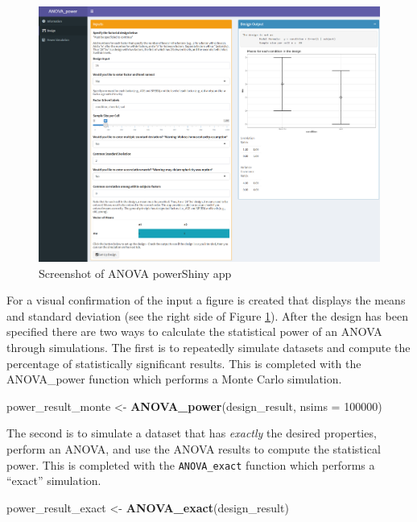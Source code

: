 \documentclass[
  ,man,floatsintext]{apa6}
\newenvironment{Shaded}{\begin{snugshade}}{\end{snugshade}}
\newcommand{\DataTypeTok}[1]{\textcolor[rgb]{0.13,0.29,0.53}{#1}}
\newcommand{\DecValTok}[1]{\textcolor[rgb]{0.00,0.00,0.81}{#1}}
\newcommand{\KeywordTok}[1]{\textcolor[rgb]{0.13,0.29,0.53}{\textbf{#1}}}
\newcommand{\NormalTok}[1]{#1}
\newcommand{\StringTok}[1]{\textcolor[rgb]{0.31,0.60,0.02}{#1}}
\begin{document}
\begin{figure}
\includegraphics[width=6.69in]{screenshots/anova_power} \caption{Screenshot of ANOVA powerShiny app}\label{fig:scr2}
\end{figure}

For a visual confirmation of the input a figure is created that displays the means and standard deviation (see the right side of Figure \ref{fig:scr2}).
After the design has been specified there are two ways to calculate the statistical power of an ANOVA through simulations.
The first is to repeatedly simulate datasets and compute the percentage of statistically significant results. This is completed with the ANOVA\_power function which performs a Monte Carlo simulation.

\begin{Shaded}
\begin{Highlighting}[]
\NormalTok{power_result_monte <-}\StringTok{ }\KeywordTok{ANOVA_power}\NormalTok{(design_result, }\DataTypeTok{nsims =} \DecValTok{100000}\NormalTok{)}
\end{Highlighting}
\end{Shaded}

The second is to simulate a dataset that has \emph{exactly} the desired properties, perform an ANOVA, and use the ANOVA results to compute the statistical power. This is completed with the \texttt{ANOVA\_exact} function which performs a \enquote{exact} simulation.

\begin{Shaded}
\begin{Highlighting}[]
\NormalTok{power_result_exact <-}\StringTok{ }\KeywordTok{ANOVA_exact}\NormalTok{(design_result)}
\end{Highlighting}
\end{Shaded}
\end{document}
